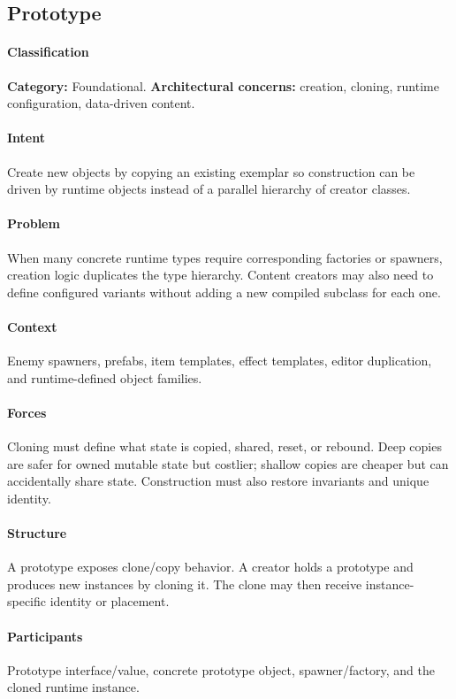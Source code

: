 \documentclass[11pt]{article}
\begin{document}
\subsection{Prototype}\label{pat:prototype}
\paragraph{Classification} \textbf{Category:} Foundational. \textbf{Architectural concerns:} creation, cloning, runtime configuration, data-driven content.
\paragraph{Intent} Create new objects by copying an existing exemplar so construction can be driven by runtime objects instead of a parallel hierarchy of creator classes.
\paragraph{Problem} When many concrete runtime types require corresponding factories or spawners, creation logic duplicates the type hierarchy. Content creators may also need to define configured variants without adding a new compiled subclass for each one.
\paragraph{Context} Enemy spawners, prefabs, item templates, effect templates, editor duplication, and runtime-defined object families.
\paragraph{Forces} Cloning must define what state is copied, shared, reset, or rebound. Deep copies are safer for owned mutable state but costlier; shallow copies are cheaper but can accidentally share state. Construction must also restore invariants and unique identity.
\paragraph{Structure} A prototype exposes clone/copy behavior. A creator holds a prototype and produces new instances by cloning it. The clone may then receive instance-specific identity or placement.
\paragraph{Participants} Prototype interface/value, concrete prototype object, spawner/factory, and the cloned runtime instance.
\end{document}
